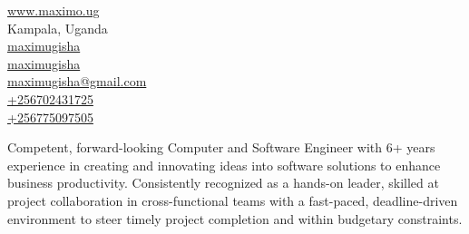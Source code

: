 \documentclass[]{plushcv}
\begin{document}
%
%


\begin{multicols}{2}
\color{BlueGreen}
{\faHome} \quad
{\href{https://www.maximo.ug}{ www.maximo.ug}} \\

{\faMapMarker} \quad
{Kampala, Uganda} \\

{\faGithub} \quad
{\href{https://www.github.com/maximugisha}{maximugisha}} \\

{\faLinkedin} \quad
{\href{https://www.linkedin.com/in/maximugisha}{maximugisha}} \\

{\faEnvelope} \quad
{\href{mailto:maximugisha@gmail.com} {maximugisha@gmail.com}} \\

{\faWhatsapp} \quad
{\href{tel:+256702431725}{+256702431725}} \\

{\faPhone} \quad
{\href{tel:+256775097505}{+256775097505}} \\
\end{multicols}

\vspace{\topsep}

{Competent, forward-looking Computer and Software Engineer with 6+ years experience in creating and  innovating ideas into software solutions to enhance business productivity. Consistently recognized as a hands-on leader, skilled at project collaboration in cross-functional teams with a fast-paced, deadline-driven environment to steer timely project completion and within budgetary constraints.}
\sectionsep
\sectionsep





\end{document}
